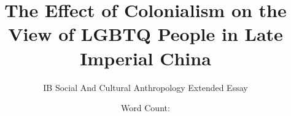 \documentclass[12pt]{turabian-researchpaper}
\title{The Effect of Colonialism on the View of LGBTQ People in Late Imperial China}
\author{IB Social And Cultural Anthropology Extended Essay}
\date{Word Count: }
\begin{document}
\begin{titlepage}
    \maketitle
\end{titlepage}

\tableofcontents
{}

\newpage

\listoffigures

\newpage

\listoftables

\newpage
{}



\newpage

\printbibliography
\end{document}

